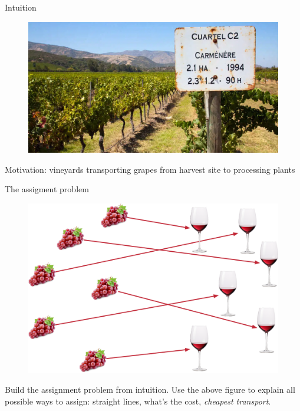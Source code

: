 \documentclass[pdf,aspectratio=169,10pt]{beamer}
\begin{document}
\begin{frame}{Intuition}
    \begin{figure}
        \includegraphics[height=0.7\textheight]{../img/wine.png}  
    \end{figure}
    Motivation: vineyards transporting grapes from harvest site to processing plants
\end{frame}


\begin{frame}{The assigment problem}
    \begin{figure}
        \includegraphics[height=0.7\textheight]{../img/wine_assignment.pdf}  
    \end{figure}
    Build the assignment problem from intuition. Use the above figure to explain all possible ways to assign: straight lines, what's the cost, \emph{cheapest transport}. 
\end{frame}
\end{document}
